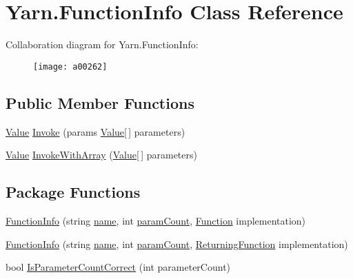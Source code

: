 \hypertarget{a00055}{\section{Yarn.\-Function\-Info Class Reference}
\label{a00055}
}


Collaboration diagram for Yarn.\-Function\-Info\-:
\nopagebreak
\begin{figure}[H]
\begin{center}
\leavevmode
\texttt{[image: a00262]}
\end{center}
\end{figure}
\subsection*{Public Member Functions}
\begin{DoxyCompactItemize}
\item 
\hyperlink{a00100}{Value} \hyperlink{a00055_ab400ac66785d7df2e3fc0f3ce3796044}{Invoke} (params \hyperlink{a00100}{Value}\mbox{[}$\,$\mbox{]} parameters)
\item 
\hyperlink{a00100}{Value} \hyperlink{a00055_a3ce11058d35232907a738de4bb094c67}{Invoke\-With\-Array} (\hyperlink{a00100}{Value}\mbox{[}$\,$\mbox{]} parameters)
\end{DoxyCompactItemize}
\subsection*{Package Functions}
\begin{DoxyCompactItemize}
\item 
\hyperlink{a00055_a93457cd0e838cb2ef59cc2a3a46ce758}{Function\-Info} (string \hyperlink{a00055_adb38e83e3c1597b553aeff14bef5bfcb}{name}, int \hyperlink{a00055_aa8527de9e4f153b05164ccaf167c3186}{param\-Count}, \hyperlink{a00040_ae0be2e5cf13d5779816102439e61ff1a}{Function} implementation)
\item 
\hyperlink{a00055_a41d97c09da25caede70cb734d18113b9}{Function\-Info} (string \hyperlink{a00055_adb38e83e3c1597b553aeff14bef5bfcb}{name}, int \hyperlink{a00055_aa8527de9e4f153b05164ccaf167c3186}{param\-Count}, \hyperlink{a00040_a5177bf74fbfe7303fac9d8236c2e514b}{Returning\-Function} implementation)
\item 
bool \hyperlink{a00055_a1ed09ff8aafa230a0d2bbc23cd6cd763}{Is\-Parameter\-Count\-Correct} (int parameter\-Count)
\end{DoxyCompactItemize}
